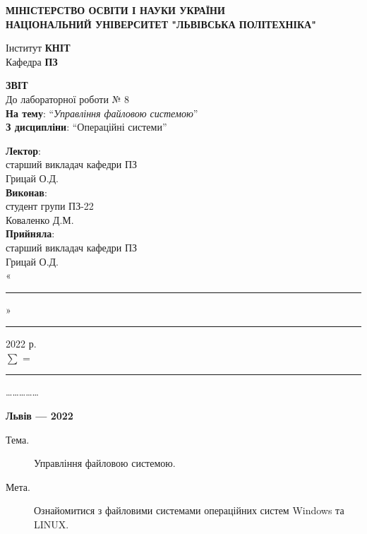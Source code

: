 \documentclass{article}
\newcommand\subject{Операційні системи}
\newcommand\lecturer{старший викладач кафедри ПЗ\\Грицай О.Д.}
\newcommand\teacher{старший викладач кафедри ПЗ\\Грицай О.Д.}
\newcommand\mygroup{ПЗ-22}
\newcommand\lab{8}
\newcommand\theme{Управління файловою системою}
\newcommand\purpose{Ознайомитися з файловими системами операційних систем Windows та
	LINUX}
\begin{document}
\begin{normalsize}
	\begin{titlepage}
		\thispagestyle{empty}
		\begin{center}
			\textbf{МІНІСТЕРСТВО ОСВІТИ І НАУКИ УКРАЇНИ\\
				НАЦІОНАЛЬНИЙ УНІВЕРСИТЕТ "ЛЬВІВСЬКА ПОЛІТЕХНІКА"}
		\end{center}
		\begin{flushright}
			Інститут \textbf{КНІТ}\\
			Кафедра \textbf{ПЗ}
		\end{flushright}
		\vspace{200pt}
		\begin{center}
			\textbf{ЗВІТ}\\
			\vspace{10pt}
			До лабораторної роботи № \lab\\
			\textbf{На тему}: “\textit{\theme}”\\
			\textbf{З дисципліни}: “\subject”
		\end{center}
		\vspace{112pt}
		\begin{flushright}
			
			\textbf{Лектор}:\\
			\lecturer\\
			\vspace{28pt}
			\textbf{Виконав}:\\
			
			студент групи \mygroup\\
			Коваленко Д.М.\\
			\vspace{28pt}
			\textbf{Прийняла}:\\
			
			\teacher\\
			
			\vspace{28pt}
			«\rule{1cm}{0.15mm}» \rule{1.5cm}{0.15mm} 2022 р.\\
			$\sum$ = \rule{1cm}{0.15mm}……………\\
			
		\end{flushright}
		\vspace{\fill}
		\begin{center}
			\textbf{Львів — 2022}
		\end{center}
	\end{titlepage}
		
	\begin{description}
		\item[Тема.] \theme.
		\item[Мета.] \purpose.
	\end{description}


\end{normalsize}
\end{document}
